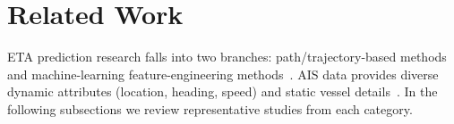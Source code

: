 \documentclass[sigconf,anonymous]{acmart}%
\begin{document}

\section{Related Work}
ETA prediction research falls into two branches: path/trajectory-based methods and machine-learning feature-engineering methods~\cite{leiPredictingVesselArrival2024}. AIS data provides diverse dynamic attributes (location, heading, speed) and static vessel details~\cite{yangHarnessingPowerMachine2024}. In the following subsections we review representative studies from each category.
\end{document}
